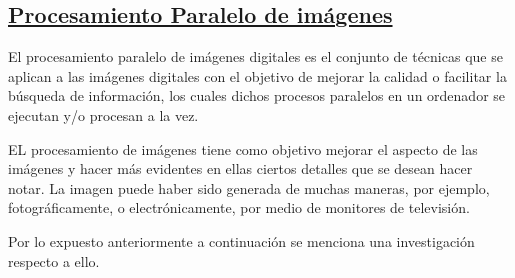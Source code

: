 \documentclass[10pt,journal]{IEEEtran}
\begin{document}
    \subsection{\underline{\textbf{Procesamiento Paralelo de imágenes}}}
    El procesamiento paralelo de imágenes digitales es el conjunto de técnicas que se aplican a las imágenes digitales con el objetivo de mejorar la calidad o facilitar la búsqueda de información, los cuales dichos procesos paralelos en un ordenador se ejecutan y/o procesan a la vez.
    
    EL procesamiento de imágenes tiene como objetivo mejorar el aspecto de las imágenes y hacer más evidentes en ellas ciertos detalles que se desean hacer notar. La imagen puede haber sido generada de muchas maneras, por ejemplo, fotográficamente, o electrónicamente, por medio de monitores de televisión.
    
    Por lo expuesto anteriormente a continuación se menciona una investigación respecto a ello.
    
\end{document}
